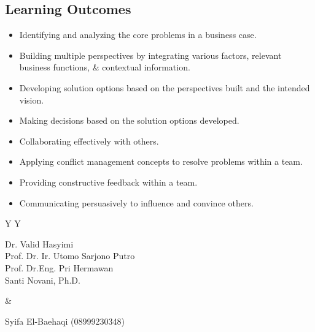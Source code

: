 \documentclass[10pt]{article}
\begin{document}
\subsection{Learning Outcomes}
\begin{itemize}
\item Identifying and analyzing the core problems in a business case.
\item Building multiple perspectives by integrating various factors, relevant business functions, \& contextual information.
\item Developing solution options based on the perspectives built and the intended vision.
\item Making decisions based on the solution options developed.
\item Collaborating effectively with others.
\item Applying conflict management concepts to resolve problems within a team.
\item Providing constructive feedback within a team.
\item Communicating persuasively to influence and convince others.
\end{itemize}

\begin{tabularx}{\textwidth}{Y Y}
\begin{tcolorbox}[colback=white,colframe=navy,title=Tim Pengajar - Dosen Pengampu,fonttitle=\bfseries]
Dr. Valid Hasyimi\\Prof. Dr. Ir. Utomo Sarjono Putro\\Prof. Dr.Eng. Pri Hermawan\\Santi Novani, Ph.D.
\end{tcolorbox}&
\begin{tcolorbox}[colback=white,colframe=midblue,title=Asisten Mata Kuliah,fonttitle=\bfseries]
Syifa El-Baehaqi (08999230348)
\end{tcolorbox}
\end{tabularx}
\end{document}
